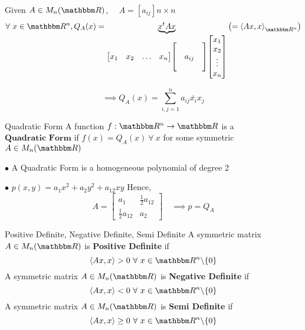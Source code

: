 \documentclass[Analysis-3]{subfiles}
\begin{document}
\begin{notnBox}
    Given $A \in M_n(\R)$, $ \quad A = \left[a_{ij}\right] n \times n $
    \[ \forall\ x \in \R^n, Q_A(x) = \underbrace{x^tAx}_{\begin{bmatrix}
                x_1 & x_2 & \ldots & x_n
            \end{bmatrix} \begin{bmatrix}
                 &        & \\
                 & a_{ij} & \\
                 &        &
            \end{bmatrix} \begin{bmatrix}
                x_1    \\
                x_2    \\
                \vdots \\
                x_n
            \end{bmatrix}} \left( = {\left\langle Ax, x \right\rangle}_{\R^n} \right) \]

    \[ \implies Q_A(x) = \sum_{i,j = 1}^{n} a_{ij} \bar{x_i} x_j  \]
\end{notnBox}


\begin{Def}{Quadratic Form}{}
    A function $f : \R^n \to \R$ is a $\textbf{Quadratic Form}$ if $f(x) = Q_A(x) \ \forall\ x $ for some symmetric $A \in M_n(\R)$
\end{Def}

$\bullet$ A Quadratic Form is a homogeneous polynomial of degree 2

\vspace{3mm}

$\bullet$ $p(x,y) = a_1 x^2 + a_2 y^2 + a_{12} xy$
Hence, \[ A = \begin{bmatrix}
        a_1                & \frac{1}{2} a_{12} \\
        \frac{1}{2} a_{12} & a_2
    \end{bmatrix} \quad \implies p = Q_A \]

\begin{Def}{Positive Definite, Negative Definite, Semi Definite}{}
    A symmetric matrix $A \in M_n(\R)$ is \textbf{Positive Definite} if \[ \left\langle Ax, x \right\rangle > 0 \ \forall\ x \in \R^n \backslash \{0\} \]
    \vspace{2mm}
    A symmetric matrix $A \in M_n(\R)$ is \textbf{Negative Definite} if \[ \left\langle Ax, x \right\rangle < 0 \ \forall\ x \in \R^n \backslash \{0\} \]
    A symmetric matrix $A \in M_n(\R)$ is \textbf{Semi Definite} if \[ \left\langle Ax, x \right\rangle \geq 0 \ \forall\ x \in \R^n \backslash \{0\} \]
\end{Def}
\end{document}

